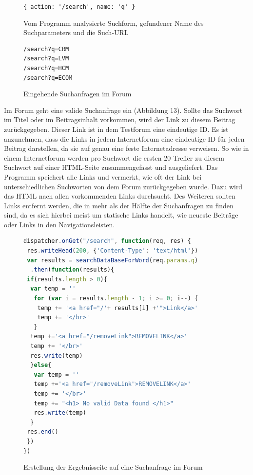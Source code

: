 \begin{figure}[ht]
\begin{lstlisting}[language=HTML5]
{ action: '/search', name: 'q' }
\end{lstlisting}
\caption{Vom Programm analysierte Suchform, gefundener Name des Suchparameters und die Such-URL}
\end{figure}


\begin{figure}[ht]
\begin{lstlisting}[language=HTML5]
/search?q=CRM
/search?q=LVM
/search?q=HCM
/search?q=ECOM
\end{lstlisting}
\caption{Eingehende Suchanfragen im Forum }
\end{figure}
Im Forum geht eine valide Suchanfrage ein (Abbildung 13).
Sollte das Suchwort im Titel oder im Beitragsinhalt vorkommen, wird der Link zu diesem Beitrag zurückgegeben. Dieser Link ist in dem Testforum eine eindeutige ID. Es ist anzunehmen, dass die Links in jedem Internetforum eine eindeutige ID für jeden Beitrag darstellen, da sie auf genau eine feste Internetadresse verweisen. So wie in einem Internetforum werden pro Suchwort die ersten 20 Treffer zu diesem Suchwort auf einer HTML-Seite zusammengefasst und ausgeliefert. Das Programm speichert alle Links und vermerkt, wie oft der Link bei unterschiedlichen Suchworten von dem Forum zurückgegeben wurde. Dazu wird das HTML nach allen vorkommenden Links durchsucht. Des Weiteren sollten Links entfernt werden, die in mehr als der Hälfte der Suchanfragen zu finden sind, da es sich hierbei meist um statische Links handelt, wie neueste Beiträge oder Links in den Navigationsleisten.
\newpage

\begin{figure}[h!]
\begin{lstlisting}[language=JavaScript]
dispatcher.onGet("/search", function(req, res) {
 res.writeHead(200, {'Content-Type': 'text/html'})
 var results = searchDataBaseForWord(req.params.q)
  .then(function(results){
 if(results.length > 0){
  var temp = ''
   for (var i = results.length - 1; i >= 0; i--) {
    temp += '<a href="/'+ results[i] +'">Link</a>'
    temp += '</br>'
   }
  temp +='<a href="/removeLink">REMOVELINK</a>'
  temp += '</br>'
  res.write(temp)
  }else{
   var temp = ''
   temp +='<a href="/removeLink">REMOVELINK</a>'
   temp += '</br>'
   temp += "<h1> No valid Data found </h1>"
   res.write(temp)
  }
 res.end() 
 }) 
})
\end{lstlisting}
\caption{Erstellung der Ergebnisseite auf eine Suchanfrage im Forum}
\end{figure}

